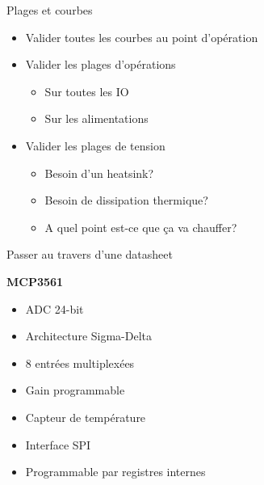 \begin{frame}{Plages et courbes}
    \begin{twocolumns}
        \leftcol
        \begin{itemize}
            \item Valider toutes les courbes au point d'opération
            \item Valider les plages d'opérations
            \begin{itemize}
                \item Sur toutes les IO
                \item Sur les alimentations
            \end{itemize}
        \end{itemize}
        \rightcol
        \begin{itemize}
            \item Valider les plages de tension
            \begin{itemize}
                \item Besoin d'un heatsink?
                \item Besoin de dissipation thermique?
                \item A quel point est-ce que ça va chauffer?
            \end{itemize}
        \end{itemize}
    \end{twocolumns}

\end{frame}

\begin{frame}{Passer au travers d'une datasheet}
    \begin{twocolumns}
        \leftcol
            \begin{center}
                \textbf{MCP3561}
            \end{center}
            \begin{itemize}
                \item ADC 24-bit
                \item Architecture Sigma-Delta
                \item 8 entrées multiplexées
                \item Gain programmable
                \item Capteur de température
                \item Interface SPI
                \item Programmable par registres internes
            \end{itemize}
        \rightcol
    \end{twocolumns}
\end{frame}

